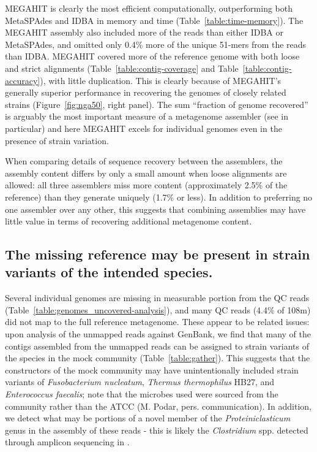 \documentclass[11pt]{article}
\begin{document}
MEGAHIT is clearly the most efficient computationally, outperforming
both MetaSPAdes and IDBA in memory and time
(Table~\ref{table:time-memory}).  The MEGAHIT assembly also included
more of the reads than either IDBA or MetaSPAdes, and omitted only 0.4\%
more of the unique 51-mers from the reads than IDBA.  MEGAHIT covered
more of the reference genome with both loose and strict alignments
(Table~\ref{table:contig-coverage} and
Table~\ref{table:contig-accuracy}), with little duplication.  This is
clearly because of MEGAHIT's generally superior performance in recovering the
genomes of closely related strains (Figure~\ref{fig:nga50}, right
panel).  The sum ``fraction of genome recovered'' is arguably the most
important measure of a metagenome assembler (see \cite{Vollmers2017}
in particular) and here MEGAHIT excels for individual genomes even in
the presence of strain variation.



When comparing details of sequence recovery between the assemblers,
the assembly content differs by only a small amount when loose
alignments are allowed: all three assemblers miss more content
(approximately 2.5\% of the reference) than they generate uniquely
(1.7\% or less).  In addition to preferring no one assembler over any
other, this suggests that combining assemblies may have little value
in terms of recovering additional metagenome content.

\subsection*{The missing reference may be present in strain variants of the intended species.}

Several individual genomes are missing in measurable portion from the
QC reads (Table~\ref{table:genomes_uncovered-analysis}), and many QC
reads (4.4\% of 108m) did not map to the full reference metagenome.
These appear to be related issues: upon analysis of the unmapped reads
against GenBank, we find that many of the contigs assembled from the
unmapped reads can be assigned to strain variants of the species in
the mock community (Table~\ref{table:gather}).  This suggests that the
constructors of the mock community may have unintentionally included
strain variants of {\em Fusobacterium nucleatum}, {\em Thermus
  thermophilus} HB27, and {\em Enterococcus faecalis}; note that the
microbes used were sourced from the community rather than the ATCC
(M. Podar, pers.  communication).  In addition, we detect what may be
portions of a novel member of the {\em Proteiniclasticum} genus in the
assembly of these reads - this is likely the {\em Clostridium} spp. detected
through amplicon sequencing in \cite{podar}.
\end{document}
